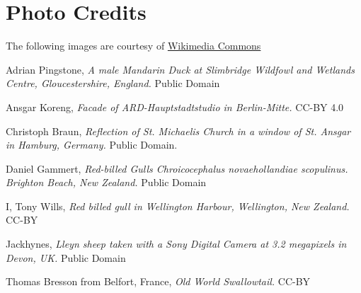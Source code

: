 \documentclass{ximera}
\begin{document}
\begin{problem}
 \begin{center}
\end{center}
 \end{problem}


\section*{Photo Credits}
The following images are courtesy of \href{https://commons.wikimedia.org/wiki/Main_Page}
{Wikimedia Commons}

Adrian Pingstone, {\it A male Mandarin Duck at Slimbridge Wildfowl and Wetlands Centre, Gloucestershire, England.} Public Domain

Ansgar Koreng, {\it Facade of ARD-Hauptstadtstudio in Berlin-Mitte.} CC-BY 4.0

Christoph Braun, {\it Reflection of St. Michaelis Church in a window of St. Ansgar in Hamburg, Germany.} Public Domain.

Daniel Gammert, {\it Red-billed Gulls Chroicocephalus novaehollandiae scopulinus. Brighton Beach, New Zealand.} Public Domain

 I, Tony Wills, {\it Red billed gull in Wellington Harbour, Wellington, New Zealand.}  CC-BY

Jackhynes, {\it Lleyn sheep taken with a Sony Digital Camera at 3.2 megapixels in Devon, UK.} Public Domain

Thomas Bresson from Belfort, France, {\it Old World Swallowtail.} CC-BY
\end{document}
